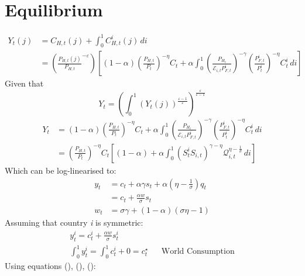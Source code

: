 \documentclass[12pt]{article}
\begin{document}
\section{Equilibrium}
\begin{align}
    Y_t(j) & = C_{H,t}(j) + \int_{0}^{1} C_{H,t}^i (j) \, di                                                                                                                                                                                                                                      \\
           & =\left(\frac{P_{H,t}(j)}{P_{H,t}}^{-\varepsilon}\right) \left[ (1-\alpha) \left(\frac{P_{H,t}}{P_t} \right)^{-\eta} C_t + \alpha \int_{0}^{1} \left( \frac{P_{H_t}}{\mathcal{E}_{i,t}P_{F,t}^i}\right)^{-\gamma} \left(\frac{P_{F,t}^i}{P_t^i} \right)^{-\eta} C_{t}^i \, di \right]
\end{align}
Given that
\begin{equation}
    Y_t = \left( \int_{0}^{1} (Y_t(j))^{\frac{\varepsilon-1}{\varepsilon}}\right)^{\frac{\varepsilon}{\varepsilon-1}}
\end{equation}
\begin{align}
    Y_t & = (1-\alpha) \left(\frac{P_{H,t}}{P_t} \right)^{-\eta} C_t + \alpha \int_{0}^{1} \left( \frac{P_{H_t}}{\mathcal{E}_{i,t}P_{F,t}^i}\right)^{-\gamma} \left(\frac{P_{F,t}^i}{P_t^i} \right)^{-\eta} C_{t}^i \, di \\
        & = \left(\frac{P_{H,t}}{P_t}\right)^{-\eta}C_t \left[ (1-\alpha) + \alpha \int_{0}^{1} (S_t^i S_{i,t})^{\gamma - \eta} \mathcal{Q}_{i,t}^{\eta - \frac{1}{\sigma}} \, di \right]
\end{align}
Which can be log-linearised to:
\begin{align}
    y_t & = c_t + \alpha \gamma s_t + \alpha(\eta - \frac{1}{\sigma})q_t \\
        & = c_t + \frac{\alpha w}{\sigma}s_t                             \\
    w_t & = \sigma \gamma + (1-\alpha)(\sigma \eta - 1)
\end{align}
Assuming that country \textit{i} is symmetric:
\begin{align}
    y_t^i = c_t^i + \frac{\alpha w}{\sigma} s_t^i            &  &                          \\
    \int_{0}^{1} y_t^i = \int_{0}^{1} c_t^i + 0 =c_t^{\star} &  & \text{World Consumption}
\end{align}
Using equations (), (), ():
\end{document}
